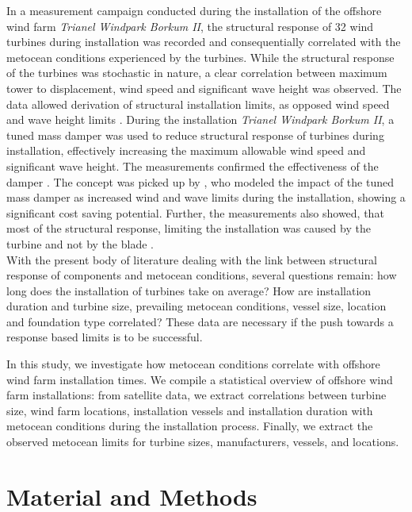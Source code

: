 \documentclass[wes, manuscript]{copernicus}
\begin{document}
In a measurement campaign conducted during the installation of the offshore wind farm \textit{Trianel Windpark Borkum II}, the structural response of 32 wind turbines during installation was recorded and consequentially correlated with the metocean conditions experienced by the turbines. While the structural response of the turbines was stochastic in nature, a clear correlation between maximum tower to displacement, wind speed and significant wave height was observed. The data allowed derivation of structural installation limits, as 	
opposed wind speed and wave height limits \citep{sander_relative_2020, sander_oscillations_2020, sander_twbii_2020}. During the installation \textit{Trianel Windpark Borkum II}, a tuned mass damper was used to reduce structural response of turbines during installation, effectively increasing the maximum allowable wind speed and significant wave height. The measurements confirmed the effectiveness of the damper \citep{sander_monitoring_2020}. The concept was picked up by \citet{oelker_evaluation_2021}, who modeled the impact of the tuned mass damper as increased wind and wave limits during the installation, showing a significant cost saving potential. Further, the measurements also showed, that most of the structural response, limiting the installation was caused by the turbine and not by the blade \citep{stroer_statistical_2022}. \\

With the present body of literature dealing with the link between structural response of components and metocean conditions, several questions remain: how long does the installation of turbines take on average? How are installation duration and turbine size, prevailing metocean conditions, vessel size, location and foundation type correlated? These data are necessary if the push towards a response based limits is to be successful. 

In this study, we investigate how metocean conditions correlate with offshore wind farm 
installation times. We compile a statistical overview of offshore wind farm installations: 
from satellite data, we extract correlations between turbine size, wind farm locations, 
installation vessels and installation duration with metocean conditions during the installation process. 
Finally, we extract the observed metocean limits for turbine sizes, manufacturers, vessels, and locations. 

\section{Material and Methods}
\end{document}
